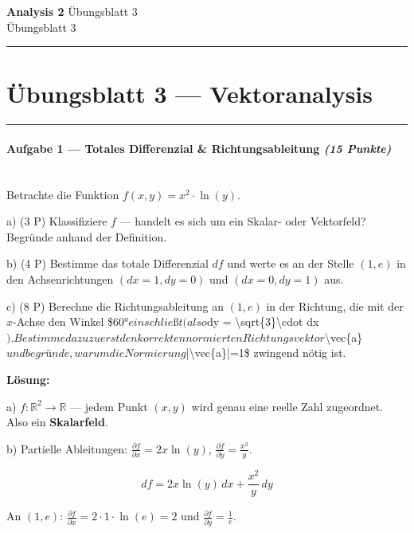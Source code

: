 \documentclass[11pt, a4paper]{article}
\providecommand{\nichttitle}{Übungsblatt}
\providecommand{\nichtsubtitle}{}
\renewcommand{\nichttitle}{Analysis 2}
\renewcommand{\nichtsubtitle}{Übungsblatt 3}
\begin{document}
\begin{center}
{\Large\bfseries\color{accent}\nichttitle}
\ifx\nichtsubtitle\empty\else
  \\[2pt]{\normalsize\color{accent!80!black}\nichtsubtitle}
\fi
\\[2pt]
\color{accent}\rule{0.4\linewidth}{0.8pt}\color{black}
\end{center}
\vspace{4pt}


\section{Übungsblatt 3 — Vektoranalysis}


\noindent\textcolor{rulegray}{\rule{\linewidth}{0.4pt}}


\paragraph{Aufgabe 1 — Totales Differenzial \& Richtungsableitung \textit{(15 Punkte)}}\mbox{}\\[2pt]

Betrachte die Funktion $f(x,y) = x^2 \cdot \ln(y)$.


a) (3 P) Klassifiziere $f$ — handelt es sich um ein Skalar- oder Vektorfeld? Begründe anhand der Definition.


b) (4 P) Bestimme das totale Differenzial $df$ und werte es an der Stelle $(1, e)$ in den Achsenrichtungen $(dx=1, dy=0)$ und $(dx=0, dy=1)$ aus.


c) (8 P) Berechne die Richtungsableitung an $(1, e)$ in der Richtung, die mit der $x$-Achse den Winkel \$60°$ einschließt (also $dy = \textbackslash{}sqrt\{3\}\textbackslash{}cdot dx$). Bestimme dazu zuerst den korrekten normierten Richtungsvektor $\textbackslash{}vec\{a\}$ und begründe, warum die Normierung $|\textbackslash{}vec\{a\}|=1\$ zwingend nötig ist.


\textbf{Lösung:}


a) $f: \mathbb{R}^2 \to \mathbb{R}$ — jedem Punkt $(x,y)$ wird genau eine reelle Zahl zugeordnet. Also ein \textbf{Skalarfeld}.


b) Partielle Ableitungen: $\frac{\partial f}{\partial x} = 2x\ln(y)$, $\frac{\partial f}{\partial y} = \frac{x^2}{y}$.

\[
df = 2x\ln(y)\,dx + \frac{x^2}{y}\,dy
\]

An $(1,e)$: $\frac{\partial f}{\partial x} = 2\cdot 1\cdot \ln(e) = 2$ und $\frac{\partial f}{\partial y} = \frac{1}{e}$.
\end{document}
